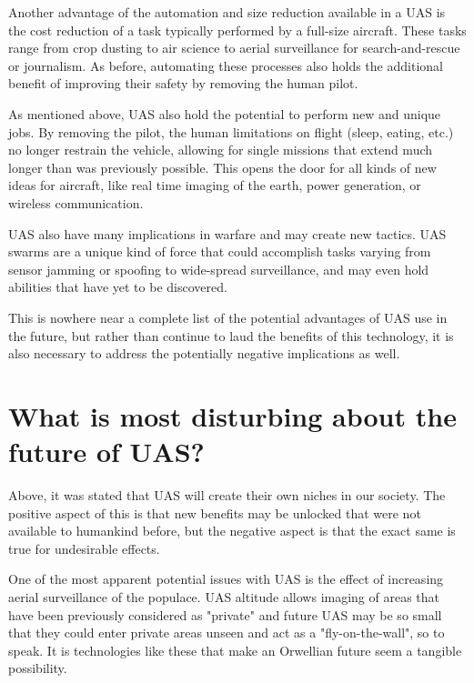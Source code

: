 \documentclass[]{aiaa-tc}%
\begin{document}
Another advantage of the automation and size reduction available in a UAS is the cost reduction of a task typically performed by a full-size aircraft.  These tasks range from crop dusting to air science to aerial surveillance for search-and-rescue or journalism.  As before, automating these processes also holds the additional benefit of improving their safety by removing the human pilot.

As mentioned above, UAS also hold the potential to perform new and unique jobs.  By removing the pilot, the human limitations on flight (sleep, eating, etc.) no longer restrain the vehicle, allowing for single missions that extend much longer than was previously possible.  This opens the door for all kinds of new ideas for aircraft, like real time imaging of the earth, power generation, or wireless communication.

UAS also have many implications in warfare and may create new tactics.  UAS swarms are a unique kind of force that could accomplish tasks varying from sensor jamming or spoofing to wide-spread surveillance, and may even hold abilities that have yet to be discovered.

This is nowhere near a complete list of the potential advantages of UAS use in the future, but rather than continue to laud the benefits of this technology, it is also necessary to address the potentially negative implications as well.

\clearpage
\section*{What is most disturbing about the future of UAS?}

Above, it was stated that UAS will create their own niches in our society.  The positive aspect of this is that new benefits may be unlocked that were not available to humankind before, but the negative aspect is that the exact same is true for undesirable effects.

One of the most apparent potential issues with UAS is the effect of increasing aerial surveillance of the populace.  UAS altitude allows imaging of areas that have been previously considered as "private" and future UAS may be so small that they could enter private areas unseen and act as a "fly-on-the-wall", so to speak.  It is technologies like these that make an Orwellian future seem a tangible possibility.
\end{document}
